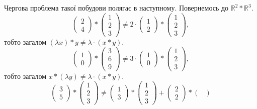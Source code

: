 \documentclass{math_library}
\begin{document}
\begin{example}
Чергова проблема такої побудови полягає в наступному. Повернемось до
$\mathbb{R}^2 * \mathbb{R}^3$.
\[ 
\begin{pmatrix}
2 \\ 4
\end{pmatrix} * \begin{pmatrix}
1 \\ 2 \\ 3
\end{pmatrix} \neq 2 \cdot \begin{pmatrix}
1 \\ 2
\end{pmatrix} * \begin{pmatrix}
1 \\ 2 \\ 3
\end{pmatrix},
\]
тобто загалом $(\lambda x)*y \neq \lambda \cdot (x*y)$.
\[
\begin{pmatrix}
1 \\ 0
\end{pmatrix} * \begin{pmatrix}
3 \\ 6 \\ 9
\end{pmatrix} \neq 3 \cdot \begin{pmatrix}
1 \\ 0
\end{pmatrix} * \begin{pmatrix}
1 \\ 2 \\ 3
\end{pmatrix},
\] 
тобто загалом $x*(\lambda y) \neq \lambda \cdot (x*y)$.
\[
\begin{pmatrix}
3 \\ 5
\end{pmatrix}* \begin{pmatrix}
1 \\ 2 \\ 3
\end{pmatrix} \neq \begin{pmatrix}
1 \\ 3
\end{pmatrix} * \begin{pmatrix}
1 \\ 2 \\ 3
\end{pmatrix} + \begin{pmatrix}
2 \\ 2
\end{pmatrix} * \begin{pmatrix}

\end{pmatrix}\]
\end{example}
\end{document}
